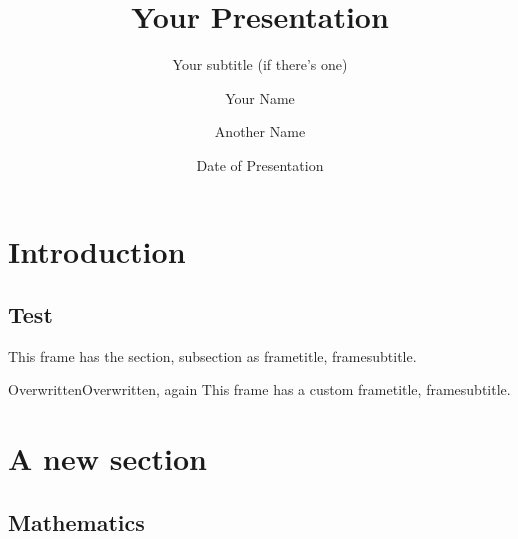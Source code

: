 \documentclass[
  10pt,
  aspectratio=169,
  xcolor={dvipsnames,table,x11names},  %
]{beamer}
\title[Your Short Title]{Your Presentation}
\subtitle{Your subtitle (if there's one)}
\author[\MakeUppercase{Your name (short)}]{Your Name \and Another Name}  %
\institute{Your Faculty/Department}
\date{Date of Presentation}
\begin{document}
{  %
\begin{frame}  %
  \titlepage
\end{frame}
}




\section{Introduction}
  \subsection{Test}

\begin{frame}
  This frame has the section, subsection as frametitle, framesubtitle.
\end{frame}



\begin{frame}{Overwritten}{Overwritten, again}
  This frame has a custom frametitle, framesubtitle.
\end{frame}



\section{A new section}
  \subsection{Mathematics}

\insertsectionpage
\end{document}
